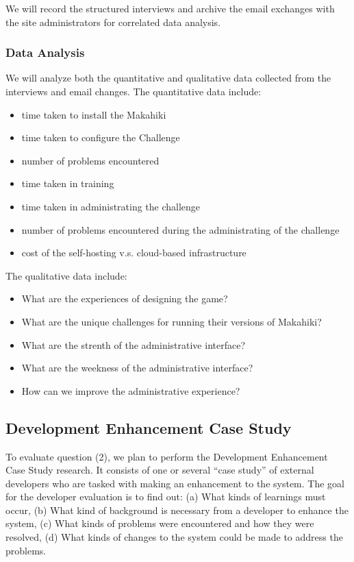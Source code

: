 \documentclass[11pt]{article}
\begin{document}
We will record the structured interviews and archive the email exchanges with the site administrators for correlated data analysis.

\subsubsection{Data Analysis}
We will analyze both the quantitative and qualitative data collected from the interviews and email changes. The quantitative data include:
\begin{itemize}
 \item time taken to install the Makahiki
 \item time taken to configure the Challenge
 \item number of problems encountered
 \item time taken in training
 \item time taken in administrating the challenge
 \item number of problems encountered during the administrating of the challenge
 \item cost of the self-hosting v.s. cloud-based infrastructure
\end{itemize}

The qualitative data include:
\begin{itemize}
 \item What are the experiences of designing the game?
 \item What are the unique challenges for running their versions of Makahiki?
 \item What are the strenth of the administrative interface?
 \item What are the weekness of the administrative interface?
 \item How can we improve the administrative experience?
\end{itemize}

\subsection{Development Enhancement Case Study}
To evaluate question (2), we plan to perform the Development Enhancement Case Study research. It consists of one or several ``case study'' of external developers who are tasked with making an enhancement to the system.  The goal for the developer evaluation is to find out: (a) What kinds of learnings must occur, (b) What kind of background is necessary from a developer to enhance the system, (c) What kinds of problems were encountered and how they were resolved, (d) What kinds of changes to the system could be made to address the problems.
\end{document}
